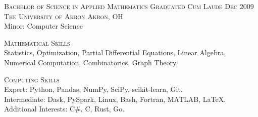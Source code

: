 \documentclass[letterpaper, 11pt]{article} %
\begin{document}
\textsc{Bachelor of Science in Applied Mathematics} \hfill \textsc{Graduated Cum Laude Dec 2009} \\
\textsc{The University of Akron \hfill Akron, OH} \\
Minor: Computer Science



\hrulefill

\textsc{Mathematical Skills} \\
    Statistics,
    Optimization,
    Partial Differential Equations,
    Linear Algebra,
    Numerical Computation,
    Combinatorics,
    Graph Theory.
    
    
\textsc{Computing Skills} \\
    Expert:
        Python,
        Pandas,
        NumPy,
        SciPy,
        scikit-learn,
        Git. \\
    Intermediate:
        Dask,
        PySpark,
        Linux,
        Bash,
        Fortran,
        MATLAB,
        \LaTeX. \\
    Additional Interests:
        C\#,
        C,
        Rust,
        Go. \\
\end{document}
